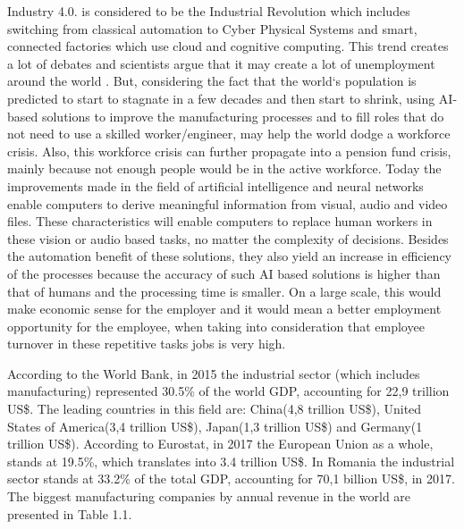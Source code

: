 \documentclass[12pt,a4paper,twoside]{report}
\begin{document}
Industry 4.0. is considered to be the  Industrial Revolution which includes switching from classical automation to Cyber Physical Systems and smart, connected factories which use cloud and cognitive computing. This trend creates a lot of debates and scientists argue that it may create a lot of unemployment around the world \cite{article-aiemplo}. But, considering the fact that the world`s population is predicted to start to stagnate in a few decades and then start to shrink, using AI-based solutions to improve the manufacturing processes and to fill roles that do not need to use a skilled worker/engineer, may help the world dodge a workforce crisis. Also, this workforce crisis can further propagate into a pension fund crisis, mainly because not enough people would be in the active workforce\cite{article-aiemplo}. Today the improvements made in the field of artificial intelligence and neural networks enable computers to derive meaningful information from visual, audio and video files\cite{article-imagenet}\cite{article-vgg}\cite{book-deeplearning}. These characteristics will enable computers to replace human workers in these vision or audio based tasks, no matter the complexity of decisions. Besides the automation benefit of these solutions, they also yield an increase in efficiency of the processes because the accuracy of such AI based solutions is higher than that of humans and the processing time is smaller. On a large scale, this would make economic sense for the employer and it would mean a better employment opportunity for the employee, when taking into consideration that employee turnover in these repetitive tasks jobs is very high. \par
According to the World Bank, in 2015 the industrial sector (which includes manufacturing) represented 30.5\% of the world GDP, accounting for 22,9 trillion US\$. The leading countries in this field are: China(4,8 trillion US\$), United States of America(3,4 trillion US\$), Japan(1,3 trillion US\$) and Germany(1 trillion US\$). According to Eurostat, in 2017 the European Union as a whole, stands at 19.5\%, which translates into 3.4 trillion US\$. In Romania the industrial sector stands at 33.2\% of the total GDP, accounting for 70,1 billion US\$, in 2017. The biggest manufacturing companies by annual revenue in the world are presented in Table 1.1. \par
\end{document}
